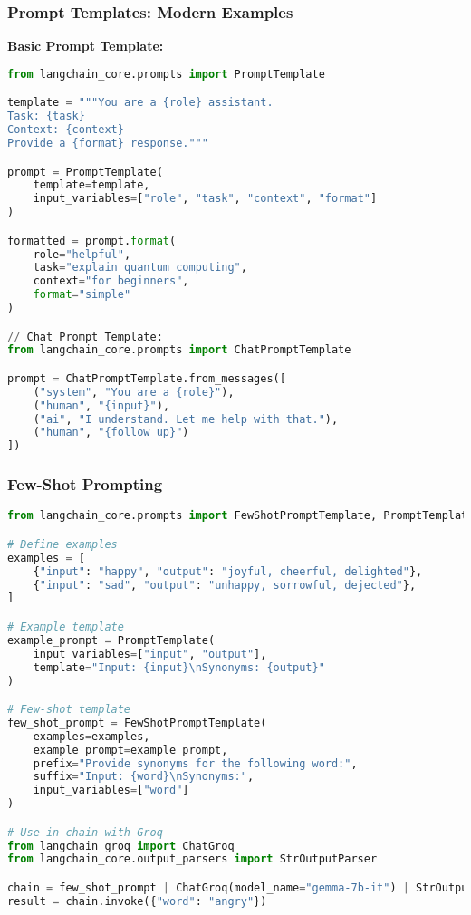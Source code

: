 \begin{frame}[fragile]\frametitle{Prompt Templates: Modern Examples}

\textbf{Basic Prompt Template:}
\begin{lstlisting}[language=python, basicstyle=\tiny]
from langchain_core.prompts import PromptTemplate

template = """You are a {role} assistant.
Task: {task}
Context: {context}
Provide a {format} response."""

prompt = PromptTemplate(
    template=template,
    input_variables=["role", "task", "context", "format"]
)

formatted = prompt.format(
    role="helpful",
    task="explain quantum computing",
    context="for beginners",
    format="simple"
)

// Chat Prompt Template:
from langchain_core.prompts import ChatPromptTemplate

prompt = ChatPromptTemplate.from_messages([
    ("system", "You are a {role}"),
    ("human", "{input}"),
    ("ai", "I understand. Let me help with that."),
    ("human", "{follow_up}")
])
\end{lstlisting}

\end{frame}

\begin{frame}[fragile]\frametitle{Few-Shot Prompting}

\begin{lstlisting}[language=python, basicstyle=\tiny]
from langchain_core.prompts import FewShotPromptTemplate, PromptTemplate

# Define examples
examples = [
    {"input": "happy", "output": "joyful, cheerful, delighted"},
    {"input": "sad", "output": "unhappy, sorrowful, dejected"},
]

# Example template
example_prompt = PromptTemplate(
    input_variables=["input", "output"],
    template="Input: {input}\nSynonyms: {output}"
)

# Few-shot template
few_shot_prompt = FewShotPromptTemplate(
    examples=examples,
    example_prompt=example_prompt,
    prefix="Provide synonyms for the following word:",
    suffix="Input: {word}\nSynonyms:",
    input_variables=["word"]
)

# Use in chain with Groq
from langchain_groq import ChatGroq
from langchain_core.output_parsers import StrOutputParser

chain = few_shot_prompt | ChatGroq(model_name="gemma-7b-it") | StrOutputParser()
result = chain.invoke({"word": "angry"})
\end{lstlisting}

\end{frame}

